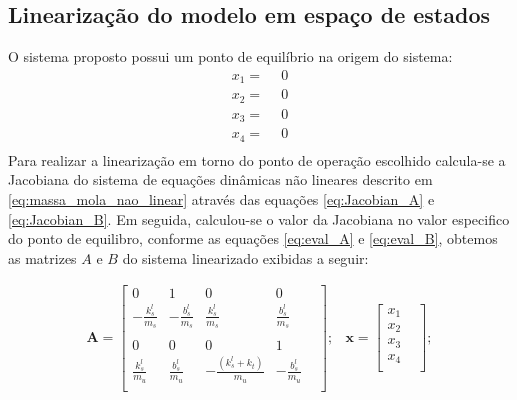 \documentclass[a4paper]{ifacconf}
\begin{document}
    \subsection{Linearização do modelo em espaço de estados}
        
    O sistema proposto possui um ponto de equilíbrio na origem do sistema:
    \begin{equation*}
        \begin{split}
        x_1=\ \ &0\\
        x_2=\ \ &0\\
        x_3=\ \ &0\\
        x_4=\ \ &0\\
        \end{split}
    \end{equation*}
    Para realizar a linearização em torno do ponto de operação escolhido calcula-se a Jacobiana do sistema de equações dinâmicas não lineares descrito em \ref{eq:massa_mola_nao_linear} através das equações \ref{eq:Jacobian_A} e \ref{eq:Jacobian_B}. Em seguida, calculou-se o valor da Jacobiana no valor especifico do ponto de equilibro, conforme as equações \ref{eq:eval_A} e \ref{eq:eval_B}, obtemos as matrizes $A$ e $B$ do sistema linearizado exibidas a seguir:
 
    \begin{equation*} 
    \begin{split}
        \mathbf{A} =
        \begin{bmatrix}
            0 & 1 & 0 & 0 & \\
            -\frac{k_{s}^{l}}{m_s}&-\frac{b_{s}^{l}}{m_s}&\frac{k_{s}^{l}}{m_s}&\frac{b_{s}^{l}}{m_s} &\\ \\
            0 & 0 & 0 & 1 & \\
            \frac{k_{s}^{l}}{m_u}&\frac{b_{s}^{l}}{m_u}&-\frac{(k_{s}^{l}+k_t)}{m_u}&-\frac{b_{s}^{l}}{m_u} &\\
        \end{bmatrix};
    \end{split}
    \begin{split}
       \mathbf{x} = 
        \begin{bmatrix}
             x_1 &\\
             x_2 &\\
             x_3 &\\
             x_4 &\\
        \end{bmatrix}; 
    \end{split}
    \end{equation*}
    
\end{document}
